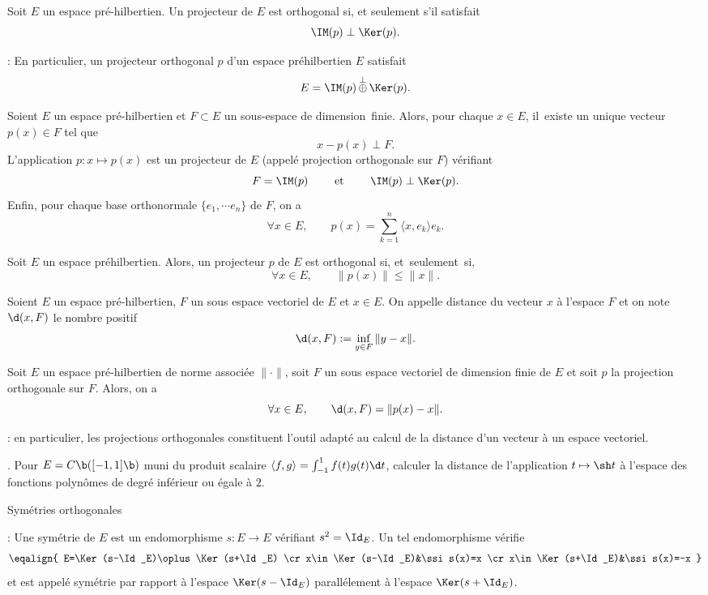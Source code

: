 \Definition []  Soit $E$ un espace pr\'e-hilbertien. Un projecteur de $E$ est orthogonal si, et seulement s'il satisfait 
$$
\IM(p)\perp\Ker(p).
$$

\Remarque : En particulier, un projecteur orthogonal $p$ d'un espace pr\'ehilbertien $E$ satisfait 
$$
E=\IM(p)\mathop{\oplus}\limits^\perp\Ker(p).
$$

\Propriete []  Soient $E$ un espace pr\'e-hilbertien et $F\subset E$ un sous-espace de dimension~finie.
Alors, pour chaque $x\in E$, il~existe un unique vecteur $p(x)\in F$ 
tel que 
$$
x-p(x)\perp F.
$$ 
L'application $p:x\mapsto p(x)$ est un projecteur de $E$ (appel\'e projection orthogonale sur $F$) v\'erifiant 
$$
F=\IM(p)\qquad\mbox{ et }\qquad \IM(p)\perp\Ker(p).
$$ 
\pn 
Enfin, pour chaque base orthonormale $\{e_1,\cdots e_n\}$ de $F$, on a 
$$
\forall x\in E, \qquad p(x)=\sum_{k=1}^n\langle x,e_k\rangle e_k.
$$

\Propriete []  Soit $E$ un espace pr\'ehilbertien. Alors, un projecteur $p$ de $E$ est orthogonal si, et~seulement~si,
$$
\forall x\in E, \qquad \|p(x)\|\le \|x\|. 
$$

\Definition []  Soient $E$ un espace pr\'e-hilbertien, $F$ un sous espace vectoriel de $E$ et $x\in E$. 
On appelle distance du vecteur $x$ \`a l'espace $F$ et on note $\d(x,F)$ le nombre positif 
$$
\d(x,F):=\inf_{y\in F}\|y-x\|.
$$

\Propriete []  Soit $E$ un espace pr\'e-hilbertien de norme associ\'ee $\|\cdot\|$, 
soit $F$ un sous espace vectoriel de dimension finie de $E$ et 
soit $p$ la projection orthogonale sur $F$. Alors, on a 
$$
\forall x\in E, \qquad \d(x,F)=\|p(x)-x\|. 
$$ 

\Remarque : en particulier, les projections orthogonales constituent l'outil adapt\'e au calcul de la distance d'un vecteur \`a un espace vectoriel. 
\bigskip


\Exercice. Pour $E=\sc C\b([-1,1]\b)$ muni du produit scalaire $\langle f,g\rangle=\int_{-1}^1 f(t)g(t)\d t$, 
calculer la distance de l'application $t\mapsto \sh t$ \`a l'espace des fonctions polyn\^omes de degr\'e inf\'erieur ou \'egale \`a $2$. 
\bigskip

\Concept [] Sym\'etries orthogonales


\Rappel :  Une sym\'etrie de $E$ est un endomorphisme $s:E\to E$ v\'erifiant $s^2=\Id_E$. Un tel endomorphisme v\'erifie
$$
\eqalign{
E=\Ker(s-\Id_E)\oplus\Ker(s+\Id_E)
\cr
x\in\Ker(s-\Id_E)&\ssi s(x)=x
\cr
x\in \Ker(s+\Id_E)&\ssi s(x)=-x
}
$$
et est appel\'e sym\'etrie par rapport \`a l'espace $\Ker(s-\Id_E)$ parall\'element \`a l'espace $\Ker(s+\Id_E)$. 
\bigskip

